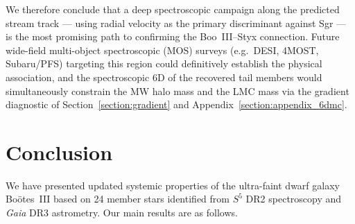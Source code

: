 \documentclass[twocolumn]{aastex631}
\newcommand{\SSSSS}{${S}^5$\xspace}
\newcommand{\gaia}{\textit{Gaia}\xspace}
\newcommand{\boo}{Bo\"{o}tes~III\xspace}
\begin{document}
We therefore conclude that a deep spectroscopic campaign along the predicted stream track --- using radial velocity as the primary discriminant against Sgr --- is the most promising path to confirming the Boo~III--Styx connection. Future wide-field multi-object spectroscopic (MOS) surveys (e.g.\ DESI, 4MOST, Subaru/PFS) targeting this region could definitively establish the physical association, and the spectroscopic 6D of the recovered tail members would simultaneously constrain the MW halo mass and the LMC mass via the gradient diagnostic of Section~\ref{section:gradient} and Appendix~\ref{section:appendix_6dmc}.


\section{Conclusion}\label{section:conclusion}

We have presented updated systemic properties of the ultra-faint dwarf galaxy \boo based on 24 member stars identified from \SSSSS DR2 spectroscopy and \gaia DR3 astrometry. Our main results are as follows.
\end{document}
